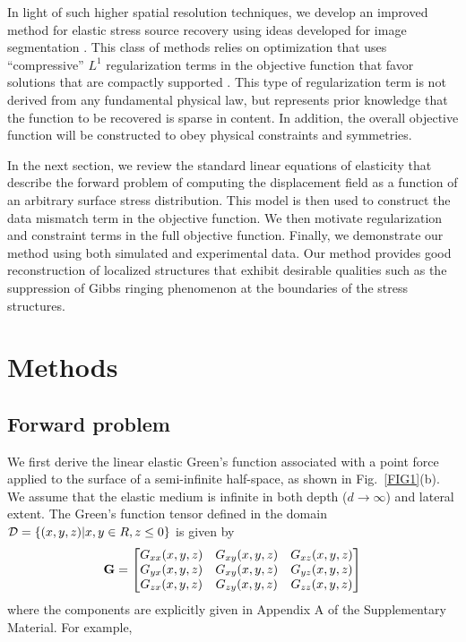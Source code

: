 \documentclass[aps,prl,reprint,groupedaddress,twocolumn]{revtex4-1}
\begin{document}
In light of such higher spatial resolution techniques, we develop an
improved method for elastic stress source recovery using ideas
developed for image segmentation \cite{OSHER}.  This class of methods
relies on optimization that uses ``compressive'' $L^{1}$
regularization terms in the objective function that favor solutions
that are compactly supported \cite{CHAN,DANUSER}.  This type of
regularization term is not derived from any fundamental physical law,
but represents prior knowledge that the function to be recovered is
sparse in content. In addition, the overall
objective function will be constructed to obey physical constraints
and symmetries.

In the next section, we review the standard linear equations of
elasticity that describe the forward problem of computing the
displacement field as a function of an arbitrary surface stress
distribution. This model is then used to construct the data mismatch
term in the objective function. We then motivate regularization and
constraint terms in the full objective function. Finally, we
demonstrate our method using both simulated and experimental data. Our
method provides good reconstruction of localized structures that
exhibit desirable qualities such  as  the suppression of Gibbs ringing
phenomenon at the boundaries of the stress structures.

\section{Methods}

\subsection{Forward problem}

We first derive the linear elastic Green's function associated with a
point force applied to the surface of a semi-infinite half-space, as
shown in Fig.~\ref{FIG1}(b). We assume that the elastic medium is
infinite in both depth ($d\to \infty$) and lateral extent. The Green's
function tensor defined in the domain ${\cal D}=\left\{(x,y,z)|x,y\in
R,z\leq0\right\}$ is given by
\begin{equation}
{\bf G} = \left[ \begin{matrix} G_{xx}(x,y,z) & G_{xy}(x,y,z) & G_{xz}(x,y,z) \\
	G_{yx}(x,y,z) & G_{xy}(x,y,z) & G_{yz}(x,y,z) \\
	G_{zx}(x,y,z) & G_{zy}(x,y,z) & G_{zz}(x,y,z) 
 \end{matrix} \right]
\end{equation}
where the components are explicitly given in 
Appendix A of the Supplementary Material. For example, 
\end{document}
